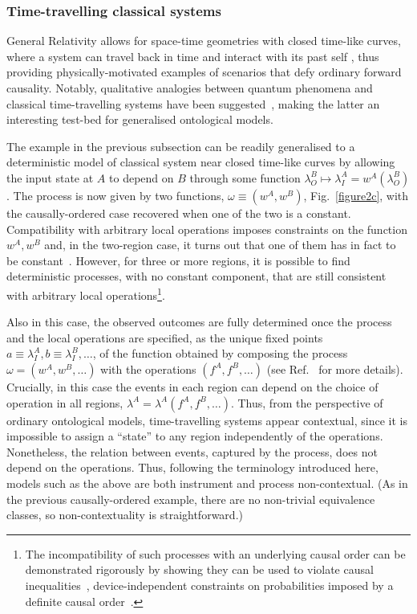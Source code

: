 \documentclass[a4paper,onecolumn,11pt,accepted=2018-05-04]{quantumarticle}
\begin{document}
%
\subsubsection{Time-travelling classical systems}
General Relativity allows for space-time geometries with closed time-like curves, where a system can travel back in time and interact with its past self \cite{morris1988wormholes}, thus providing physically-motivated examples of scenarios that defy ordinary forward causality. Notably, qualitative analogies between quantum phenomena and classical time-travelling systems have been suggested~\cite{Durand2002}, making the latter an interesting test-bed for generalised ontological models.

The example in the previous subsection can be readily generalised to a deterministic model of classical system near closed time-like curves by allowing the input state at $A$ to depend on $B$ through some function $\lambda_O^B \mapsto \lambda_I^A = w^A\left(\lambda_O^B\right)$. The process is now given by two functions, $\omega\equiv\left(w^A, w^B\right)$, Fig.~\ref{figure2c}, with the causally-ordered case recovered when one of the two is a constant. Compatibility with arbitrary local operations imposes constraints on the function $w^A, w^B$ and, in the two-region case, it turns out that one of them has in fact to be constant~\cite{Baumeler2016, baumeler2017reversible}. However, for three or more regions, it is possible to find deterministic processes, with no constant component, that are still consistent with arbitrary local operations\footnote{The incompatibility of such processes with an underlying causal order can be demonstrated rigorously by showing they can be used to violate causal inequalities~\cite{baumeler14}, device-independent constraints on probabilities imposed by a definite causal order~\cite{oreshkov12, Branciard2016}.}.


Also in this case, the observed outcomes are fully determined once the process and the local operations are specified, as the unique fixed points $a\equiv \lambda_I^A, b\equiv \lambda_I^B,\dots$, of the function obtained by composing the process  $\omega=\left(w^A, w^B,\dots\right)$ with the operations $\left(f^A,f^B,\dots\right)$ (see Ref.~\cite{baumeler2017reversible} for more details). Crucially, in this case the events in each region can depend on the choice of operation in all regions, $\lambda^A=\lambda^A(f^A,f^B,\dots)$. Thus, from the perspective of ordinary ontological models, time-travelling systems appear contextual, since it is impossible to assign a ``state'' to any region independently of the operations. Nonetheless, the relation between events, captured by the process, does not depend on the operations. Thus, following the terminology introduced here, models such as the above are both instrument and process non-contextual. (As in the previous causally-ordered example, there are no non-trivial equivalence classes, so non-contextuality is straightforward.)
\end{document}
